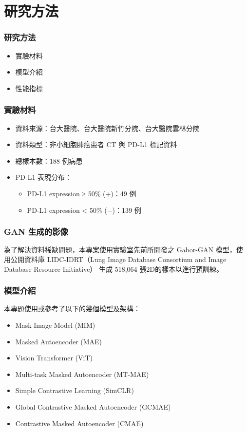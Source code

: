 \documentclass[xcolor=dvipsnames]{beamer}
\begin{document}
    \section{研究方法}
    \begin{frame}
        \sectionpage
    \end{frame}

    \begin{frame}
        \frametitle{研究方法}
        \begin{itemize}
            \item 實驗材料
            \item 模型介紹
            \item 性能指標
        \end{itemize}
    \end{frame}

    \begin{frame}
        \frametitle{實驗材料}
        \begin{itemize}
            \item 資料來源：台大醫院、台大醫院新竹分院、台大醫院雲林分院
            \item 資料類型：非小細胞肺癌患者 CT 與 PD-L1 標記資料
            \item 總樣本數：188 例病患
            \item PD-L1 表現分布：
                \begin{itemize}
                    \item PD-L1 expression ≥ 50\% (+)：49 例
                    \item PD-L1 expression < 50\% (−)：139 例
                \end{itemize}
        \end{itemize}
    \end{frame}

    \begin{frame}
        \frametitle{GAN 生成的影像}
        為了解決資料稀缺問題，本專案使用實驗室先前所開發之 Gabor-GAN 模型，使用公開資料庫 LIDC-IDRT（Lung Image Database Consortium and Image Database Resource Initiative） 生成 518,064 張2D的樣本以進行預訓練。

    \end{frame}

    \begin{frame}
        \frametitle{模型介紹}
        本專題使用或參考了以下的幾個模型及架構：
        \begin{itemize}
            \item Mask Image Model (MIM)
            \item Masked Autoencoder (MAE)
            \item Vision Transformer (ViT)
            \item Multi-task Masked Autoencoder (MT-MAE)
            \item Simple Contrastive Learning (SimCLR)
            \item Global Contrastive Masked Autoencoder (GCMAE)
            \item Contrastive Masked Autoencoder (CMAE)
        \end{itemize}
    \end{frame}
\end{document}
